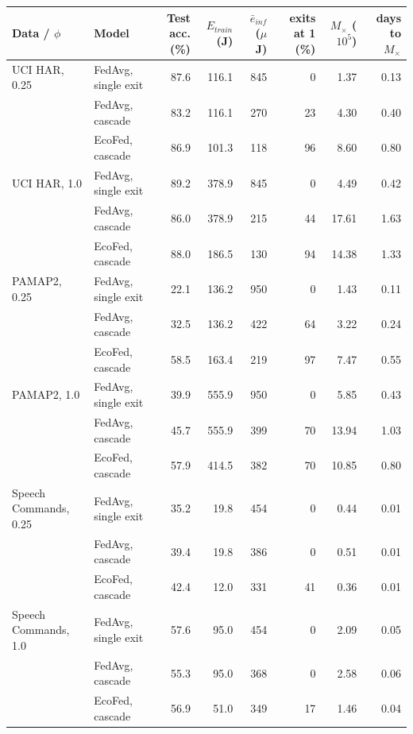 \begin{tabular}{@{}llrrrrrr@{}}
\toprule
Data / $\phi$ & Model & Test acc. (\%) & $E_{train}$ (J) & $\bar e_{inf}$ ($\mu$J) & exits at 1 (\%) & $M_\times$ ($10^5$) & days to $M_\times$\\
\midrule
UCI HAR, 0.25 & FedAvg, single exit & 87.6 & 116.1 & 845 & 0 & 1.37 & 0.13\\
 & FedAvg, cascade & 83.2 & 116.1 & 270 & 23 & 4.30 & 0.40\\
 & EcoFed, cascade & 86.9 & 101.3 & 118 & 96 & 8.60 & 0.80\\
\midrule
UCI HAR, 1.0 & FedAvg, single exit & 89.2 & 378.9 & 845 & 0 & 4.49 & 0.42\\
 & FedAvg, cascade & 86.0 & 378.9 & 215 & 44 & 17.61 & 1.63\\
 & EcoFed, cascade & 88.0 & 186.5 & 130 & 94 & 14.38 & 1.33\\
\midrule
PAMAP2, 0.25 & FedAvg, single exit & 22.1 & 136.2 & 950 & 0 & 1.43 & 0.11\\
 & FedAvg, cascade & 32.5 & 136.2 & 422 & 64 & 3.22 & 0.24\\
 & EcoFed, cascade & 58.5 & 163.4 & 219 & 97 & 7.47 & 0.55\\
\midrule
PAMAP2, 1.0 & FedAvg, single exit & 39.9 & 555.9 & 950 & 0 & 5.85 & 0.43\\
 & FedAvg, cascade & 45.7 & 555.9 & 399 & 70 & 13.94 & 1.03\\
 & EcoFed, cascade & 57.9 & 414.5 & 382 & 70 & 10.85 & 0.80\\
\midrule
Speech Commands, 0.25 & FedAvg, single exit & 35.2 & 19.8 & 454 & 0 & 0.44 & 0.01\\
 & FedAvg, cascade & 39.4 & 19.8 & 386 & 0 & 0.51 & 0.01\\
 & EcoFed, cascade & 42.4 & 12.0 & 331 & 41 & 0.36 & 0.01\\
\midrule
Speech Commands, 1.0 & FedAvg, single exit & 57.6 & 95.0 & 454 & 0 & 2.09 & 0.05\\
 & FedAvg, cascade & 55.3 & 95.0 & 368 & 0 & 2.58 & 0.06\\
 & EcoFed, cascade & 56.9 & 51.0 & 349 & 17 & 1.46 & 0.04\\
\bottomrule
\end{tabular}
